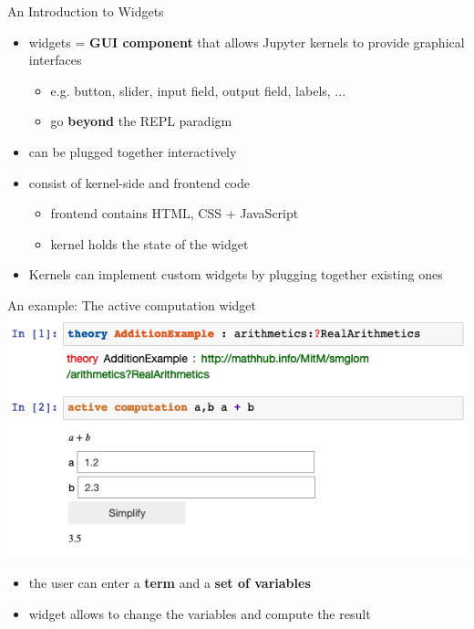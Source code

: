 \documentclass{beamer}
\begin{document}
    \begin{frame}{An Introduction to Widgets}
        \begin{itemize}
            \item widgets = \textbf{GUI component} that allows Jupyter kernels to provide graphical interfaces
            \begin{itemize}
                \item e.g. button, slider, input field, output field, labels, ...
                \item go \textbf{beyond} the REPL paradigm
            \end{itemize}

            \item can be plugged together interactively
            \item consist of kernel-side and frontend code
            \begin{itemize}
                \item frontend contains HTML, CSS + JavaScript
                \item kernel holds the state of the widget
            \end{itemize}
            \item Kernels can implement custom widgets by plugging together existing ones
        \end{itemize}
    \end{frame}

    \begin{frame}{An example: The active computation widget}
        \includegraphics[scale=.5]{images/activecomp}
        \begin{itemize}
            \item the user can enter a \textbf{term} and a \textbf{set of variables}
            \item widget allows to change the variables and compute the result
        \end{itemize}
    \end{frame}
\end{document}
